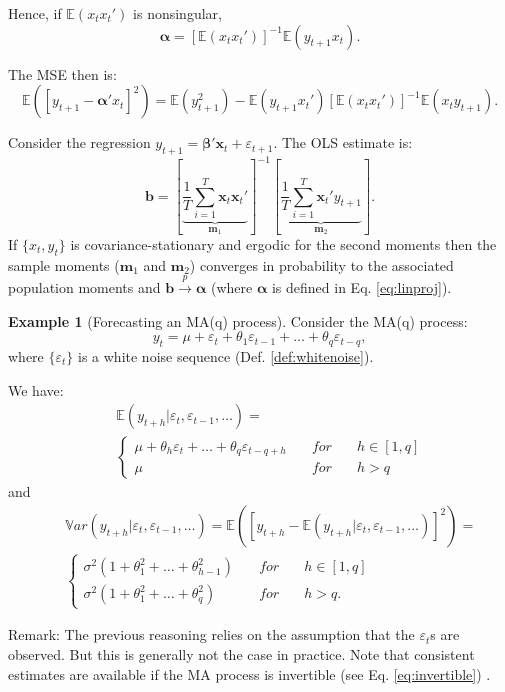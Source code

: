 \documentclass[
  12pt,
]{book}
\theoremstyle{definition}
\theoremstyle{definition}
\newtheorem{example}{Example}[chapter]
\theoremstyle{definition}
\theoremstyle{definition}
\theoremstyle{remark}
\begin{document}
Hence, if \(\mathbb{E}\left(x_tx_t' \right)\) is nonsingular,
\begin{equation}
\boldsymbol\alpha=[\mathbb{E}\left(x_tx_t' \right)]^{-1}\mathbb{E}\left( y_{t+1}x_t \right).\label{eq:linproj}
\end{equation}

The MSE then is:
\[
\mathbb{E}([y_{t+1} - \boldsymbol\alpha'x_t]^2) = \mathbb{E}{(y_{t+1}^2)} - \mathbb{E}\left( y_{t+1}x_t' \right)[\mathbb{E}\left(x_tx_t' \right)]^{-1}\mathbb{E}\left(x_ty_{t+1} \right).
\]

Consider the regression \(y_{t+1} = \boldsymbol\beta'\mathbf{x}_t + \varepsilon_{t+1}\). The OLS estimate is:
\[
\mathbf{b} = \left[ \underbrace{ \frac{1}{T} \sum_{i=1}^T \mathbf{x}_t\mathbf{x}_t'}_{\mathbf{m}_1} \right]^{-1}\left[  \underbrace{ \frac{1}{T} \sum_{i=1}^T \mathbf{x}_t'y_{t+1}}_{\mathbf{m}_2} \right].
\]
If \(\{x_t,y_t\}\) is covariance-stationary and ergodic for the second moments then the sample moments (\(\mathbf{m}_1\) and \(\mathbf{m}_2\)) converges in probability to the associated population moments and \(\mathbf{b} \overset{p}{\rightarrow} \boldsymbol\alpha\) (where \(\boldsymbol\alpha\) is defined in Eq. \eqref{eq:linproj}).

\begin{example}[Forecasting an MA(q) process]
\protect\hypertarget{exm:fcstMAq}{}\label{exm:fcstMAq}Consider the MA(q) process:
\[
y_t = \mu + \varepsilon_t + \theta_1 \varepsilon_{t-1} + \dots + \theta_q \varepsilon_{t-q},
\]
where \(\{\varepsilon_t\}\) is a white noise sequence (Def. \ref{def:whitenoise}).

We have:
\begin{eqnarray*}
&&\mathbb{E}(y_{t+h}|\varepsilon_{t},\varepsilon_{t-1},\dots) =\\
&&\left\{
\begin{array}{lll}
\mu + \theta_h \varepsilon_{t} + \dots + \theta_q \varepsilon_{t-q+h}  \quad &for& \quad h \in [1,q]\\
\mu \quad &for& \quad h > q
\end{array}
\right.
\end{eqnarray*}
and
\begin{eqnarray*}
&&\mathbb{V}ar(y_{t+h}|\varepsilon_{t},\varepsilon_{t-1},\dots)= \mathbb{E}\left( [y_{t+h} - \mathbb{E}(y_{t+h}|\varepsilon_{t},\varepsilon_{t-1},\dots)]^2 \right) =\\
&&\left\{
\begin{array}{lll}
\sigma^2(1+\theta_1^2+\dots+\theta_{h-1}^2) \quad &for& \quad h \in [1,q]\\
\sigma^2(1+\theta_1^2+\dots+\theta_q^2) \quad &for& \quad h>q.
\end{array}
\right.
\end{eqnarray*}

Remark: The previous reasoning relies on the assumption that the \(\varepsilon_t\)s are observed. But this is generally not the case in practice. Note that consistent estimates are available if the MA process is invertible (see Eq. \eqref{eq:invertible}) .
\end{example}
\end{document}
